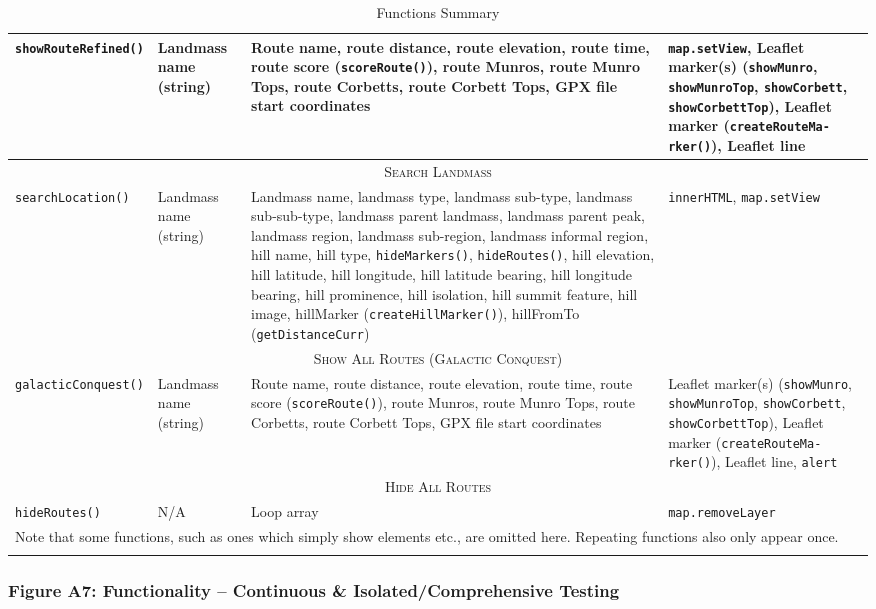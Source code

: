 \documentclass[11pt, english]{article}
\begin{document}
\begin{center}
\begin{longtable}{p{2.25cm}p{3.5cm}p{5cm}p{2cm}}
		\hline
		\texttt{showRouteRefined()} & Landmass name (string) & Route name, route distance, route elevation, route time, route score (\texttt{scoreRoute()}), route Munros, route Munro Tops, route Corbetts, route Corbett Tops, GPX file start coordinates & \texttt{map.setView}, Leaflet marker(s) (\texttt{showMunro}, \texttt{showMunroTop}, \texttt{showCorbett}, \texttt{showCorbettTop}), Leaflet marker (\texttt{createRouteMa- rker()}), Leaflet line\\
		\hline
		\multicolumn{4}{c}{\textsc{Search Landmass}}\\
		\hline
		\texttt{searchLocation()} & Landmass name (string) & Landmass name, landmass type, landmass sub-type, landmass sub-sub-type, landmass parent landmass, landmass parent peak, landmass region, landmass sub-region, landmass informal region, hill name, hill type, \texttt{hideMarkers()}, \texttt{hideRoutes()}, hill elevation, hill latitude, hill longitude, hill latitude bearing, hill longitude bearing, hill prominence, hill isolation, hill summit feature, hill image, hillMarker (\texttt{createHillMarker()}), hillFromTo (\texttt{getDistanceCurr}) & \texttt{innerHTML}, \texttt{map.setView}\\
		\hline
		\multicolumn{4}{c}{\textsc{Show All Routes (Galactic Conquest)}}\\
		\hline
		\texttt{galacticConquest()} & Landmass name (string) & Route name, route distance, route elevation, route time, route score (\texttt{scoreRoute()}), route Munros, route Munro Tops, route Corbetts, route Corbett Tops, GPX file start coordinates & Leaflet marker(s) (\texttt{showMunro}, \texttt{showMunroTop}, \texttt{showCorbett}, \texttt{showCorbettTop}), Leaflet marker (\texttt{createRouteMa- rker()}), Leaflet line, \texttt{alert}\\
		\hline
		\multicolumn{4}{c}{\textsc{Hide All Routes}}\\
		\hline
		\texttt{hideRoutes()} & N/A & Loop array & \texttt{map.removeLayer}\\
		\hline
		\multicolumn{4}{p{14cm}}{Note that some functions, such as ones which simply show elements etc., are omitted here. Repeating functions also only appear once.}\\
		\hline
		\caption{Functions Summary}
	\end{longtable}
	\end{center}

\newpage

		\subsubsection*{Figure A7: Functionality -- Continuous \& Isolated/Comprehensive Testing}
\end{document}
